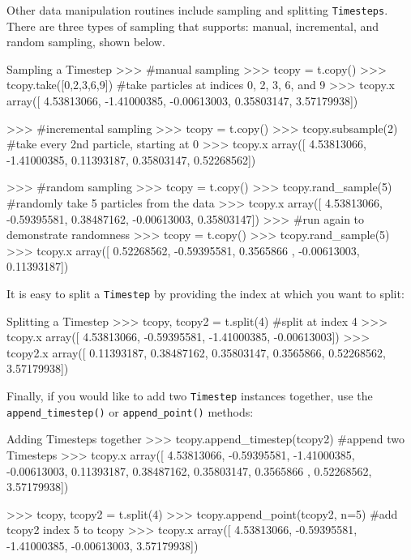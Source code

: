 \documentclass{article}
\begin{document}
Other data manipulation routines include sampling and splitting \verb!Timesteps!. There are three types of sampling that \mwahpy supports: manual, incremental, and random sampling, shown below. \\

\begin{codelisting}{Sampling a Timestep}
>>> #manual sampling
>>> tcopy = t.copy()
>>> tcopy.take([0,2,3,6,9]) #take particles at indices 0, 2, 3, 6, and 9
>>> tcopy.x
array([ 4.53813066, -1.41000385, -0.00613003,  0.35803147,  3.57179938])

>>> #incremental sampling
>>> tcopy = t.copy()
>>> tcopy.subsample(2) #take every 2nd particle, starting at 0
>>> tcopy.x
array([ 4.53813066, -1.41000385,  0.11393187,  0.35803147,  0.52268562])

>>> #random sampling
>>> tcopy = t.copy()
>>> tcopy.rand_sample(5) #randomly take 5 particles from the data
>>> tcopy.x
array([ 4.53813066, -0.59395581,  0.38487162, -0.00613003,  0.35803147])
>>> #run again to demonstrate randomness
>>> tcopy = t.copy()
>>> tcopy.rand_sample(5)
>>> tcopy.x
array([ 0.52268562, -0.59395581,  0.3565866 , -0.00613003,  0.11393187])
\end{codelisting}

It is easy to split a \verb!Timestep! by providing the index at which you want to split: \\

\begin{codelisting}{Splitting a Timestep}
>>> tcopy, tcopy2 = t.split(4) #split at index 4
>>> tcopy.x
array([ 4.53813066, -0.59395581, -1.41000385, -0.00613003])
>>> tcopy2.x
array([ 0.11393187,  0.38487162,  0.35803147,  0.3565866,   0.52268562, 
3.57179938])
\end{codelisting}

Finally, if you would like to add two \verb!Timestep! instances together, use the \verb!append_timestep()! or \verb!append_point()! methods: \\

\begin{codelisting}{Adding Timesteps together}
>>> tcopy.append_timestep(tcopy2) #append two Timesteps
>>> tcopy.x
array([ 4.53813066, -0.59395581, -1.41000385, -0.00613003,  0.11393187,
        0.38487162,  0.35803147,  0.3565866 ,  0.52268562,  3.57179938])
        
>>> tcopy, tcopy2 = t.split(4)
>>> tcopy.append_point(tcopy2, n=5) #add tcopy2 index 5 to tcopy
>>> tcopy.x
array([ 4.53813066, -0.59395581, -1.41000385, -0.00613003,  3.57179938])
\end{codelisting}
\end{document}
